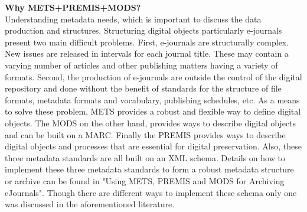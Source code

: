 \begin{enumerate}
	{\bf Why METS+PREMIS+MODS? }\\
	Understanding metadata needs, which is important to discuss the data production and structures. 
	Structuring digital objects particularly e-journals present two main difficult problems. 
	First, e-journals are structurally complex. New issues are released in intervals for each journal title. 
	These may contain a varying number of articles and other publishing matters having a variety of formats. 
	Second, the production of e-journals are outside the control of the digital repository and done without the benefit of standards for the structure of file formats, 
	metadata formats and vocabulary, publishing schedules, etc.\cite{Dappert2008}
	As a means to solve these problem, METS provides a robust and flexible way to define digital objects. The MODS on the other hand, provides ways to describe digital objects and can be built on a MARC. 
	Finally the PREMIS provides ways to describe digital objects and processes that are essential for digital preservation. 
	Also, these three metadata standards are all built on an XML schema.\cite{Dappert2008}
	Details on how to implement these three metadata standards to form a robust metadata structure or archive can be found in "Using METS, PREMIS and MODS for Archiving eJournals".\cite{Dappert2008} 
	Though there are different ways to implement these schema only one was discussed in the aforementioned literature.
	

\end{enumerate}
